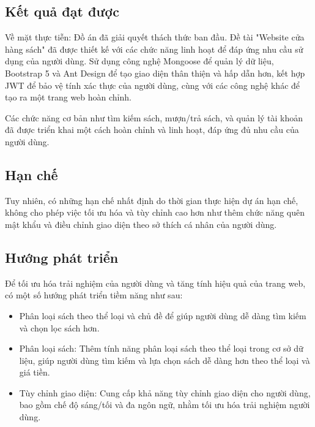 {}
\setcounter{section}{5}
\setcounter{subsection}{0}


\subsection{Kết quả đạt được}
Về mặt thực tiễn: Đồ án đã giải quyết thách thức ban đầu. Đề tài "Website cửa hàng sách" đã được thiết kế với các chức năng linh hoạt để đáp ứng nhu cầu sử dụng của người dùng. Sử dụng công nghệ Mongoose để quản lý dữ liệu, Bootstrap 5 và Ant Design để tạo giao diện thân thiện và hấp dẫn hơn, kết hợp JWT để bảo vệ tính xác thực của người dùng, cùng với các công nghệ khác để tạo ra một trang web hoàn chỉnh.
\par
Các chức năng cơ bản như tìm kiếm sách, mượn/trả sách, và quản lý tài khoản đã được triển khai một cách hoàn chỉnh và linh hoạt, đáp ứng đủ nhu cầu của người dùng.

\subsection{Hạn chế}
Tuy nhiên, có những hạn chế nhất định do thời gian thực hiện dự án hạn chế, không cho phép việc tối ưu hóa và tùy chỉnh cao hơn như thêm chức năng quên mật khẩu và điều chỉnh giao diện theo sở thích cá nhân của người dùng.



\subsection{Hướng phát triển}
Để tối ưu hóa trải nghiệm của người dùng và tăng tính hiệu quả của trang web, có một số hướng phát triển tiềm năng như sau:

\begin{itemize}[label={+}]
          \item Phân loại sách theo thể loại và chủ đề để giúp người dùng dễ dàng tìm kiếm và chọn lọc sách hơn.
          \item Phân loại sách: Thêm tính năng phân loại sách theo thể loại trong cơ sở dữ liệu, giúp người dùng tìm kiếm và lựa chọn sách dễ dàng hơn theo thể loại và giá tiền.
          \item Tùy chỉnh giao diện: Cung cấp khả năng tùy chỉnh giao diện cho người dùng, bao gồm chế độ sáng/tối và đa ngôn ngữ, nhằm tối ưu hóa trải nghiệm người dùng.
\end{itemize}